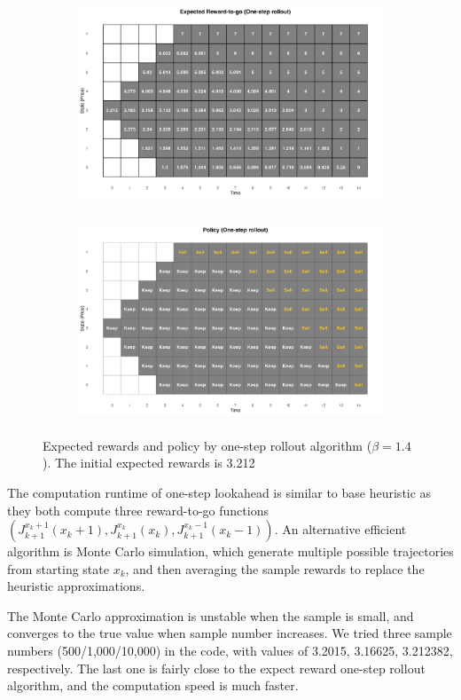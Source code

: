\documentclass[11pt]{article}
\begin{document}
\begin{enumerate}[label=(\alph*)]
    \begin{figure}[h]
    \begin{subfigure}{0.5\textwidth}
    \includegraphics[width=0.9\linewidth, height=6cm]{media/hw2/partc1.png} 
    \label{fig:partc1}
    \end{subfigure}
    \begin{subfigure}{0.5\textwidth}
    \includegraphics[width=0.9\linewidth, height=6cm]{media/hw2/partc2.png}
    \label{fig:partc2}
    \end{subfigure}
    \caption{Expected rewards and policy by one-step rollout algorithm ($\beta = 1.4$). The initial expected rewards is 3.212}
    \label{fig:partc}
    \end{figure}

    The computation runtime of one-step lookahead is similar to base heuristic as they both compute three reward-to-go functions $(J^{x_k + 1}_{k+1}(x_k+1), J^{x_k }_{k+1}(x_k), J^{x_k - 1}_{k+1}(x_k-1))$. An alternative efficient algorithm is Monte Carlo simulation, which generate multiple possible trajectories from starting state $x_k$, and then averaging the sample rewards to replace the heuristic approximations.

    The Monte Carlo approximation is unstable when the sample is small, and converges to the true value when sample number increases. We tried three sample numbers (500/1,000/10,000) in the code, with values of 3.2015, 3.16625, 3.212382, respectively. The last one is fairly close to the expect reward one-step rollout algorithm, and the computation speed is much faster.
    

\end{enumerate}
\end{document}
